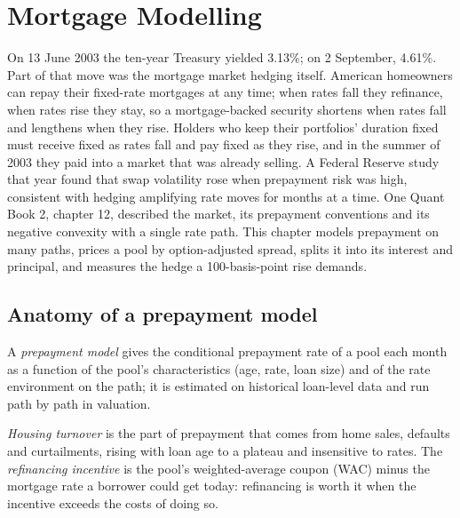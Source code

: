 \chapter{Mortgage Modelling}\label{ch:rc:mortgage-modelling}

On 13 June 2003 the ten-year Treasury yielded 3.13\%; on 2 September, 4.61\%. Part
of that move was the mortgage market hedging itself. American homeowners can repay
their fixed-rate mortgages at any time; when rates fall they refinance, when rates
rise they stay, so a mortgage-backed security shortens when rates fall and lengthens
when they rise. Holders who keep their portfolios' duration fixed must receive fixed
as rates fall and pay fixed as they rise, and in the summer of 2003 they paid into a
market that was already selling. A Federal Reserve study that year found that swap
volatility rose when prepayment risk was high, consistent with hedging amplifying
rate moves for months at a time. One Quant Book 2, chapter 12, described the market,
its prepayment conventions and its negative convexity with a single rate path. This
chapter models prepayment on many paths, prices a pool by option-adjusted spread,
splits it into its interest and principal, and measures the hedge a 100-basis-point
rise demands.

\section{Anatomy of a prepayment model}

\begin{definition}\label{def:rc:mortgage-modelling:model}
A \emph{prepayment model} gives the conditional prepayment
rate of a pool each month as a function of the pool's characteristics (age, rate,
loan size) and of the rate environment on the path; it is estimated on historical
loan-level data and run path by path in valuation.
\end{definition}

\begin{definition}\label{def:rc:mortgage-modelling:turnover}
\emph{Housing turnover} is the part of prepayment that comes
from home sales, defaults and curtailments, rising with loan age to a plateau and
insensitive to rates. The \emph{refinancing incentive} is
the pool's weighted-average coupon (WAC) minus the mortgage rate a borrower could get
today: refinancing is worth it when the incentive exceeds the costs of doing so.
\end{definition}

